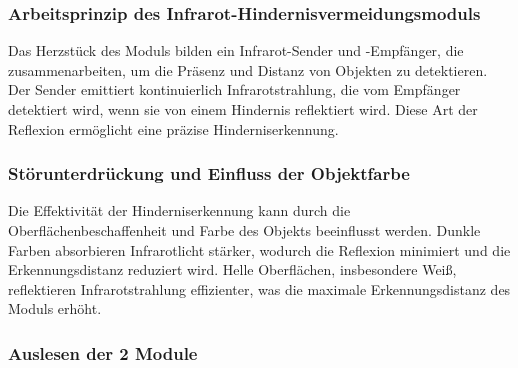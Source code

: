 \documentclass{vorlage-design-main}
\begin{document}
\hypertarget{arbeitsprinzip-des-infrarot-hindernisvermeidungsmoduls}{%
\subsubsection{Arbeitsprinzip des
Infrarot-Hindernisvermeidungsmoduls}\label{arbeitsprinzip-des-infrarot-hindernisvermeidungsmoduls}}

Das Herzstück des Moduls bilden ein Infrarot-Sender und -Empfänger, die
zusammenarbeiten, um die Präsenz und Distanz von Objekten zu
detektieren. Der Sender emittiert kontinuierlich Infrarotstrahlung, die
vom Empfänger detektiert wird, wenn sie von einem Hindernis reflektiert
wird. Diese Art der Reflexion ermöglicht eine präzise
Hinderniserkennung.

\hypertarget{stuxf6runterdruxfcckung-und-einfluss-der-objektfarbe}{%
\subsubsection{Störunterdrückung und Einfluss der
Objektfarbe}\label{stoerunterdrueckung-und-einfluss-der-objektfarbe}}

Die Effektivität der Hinderniserkennung kann durch die
Oberflächenbeschaffenheit und Farbe des Objekts beeinflusst werden.
Dunkle Farben absorbieren Infrarotlicht stärker, wodurch die Reflexion
minimiert und die Erkennungsdistanz reduziert wird. Helle Oberflächen,
insbesondere Weiß, reflektieren Infrarotstrahlung effizienter, was die
maximale Erkennungsdistanz des Moduls erhöht.

\hypertarget{auslesen-der-2-module}{%
\subsubsection{Auslesen der 2 Module}\label{auslesen-der-2-module}}
\end{document}
